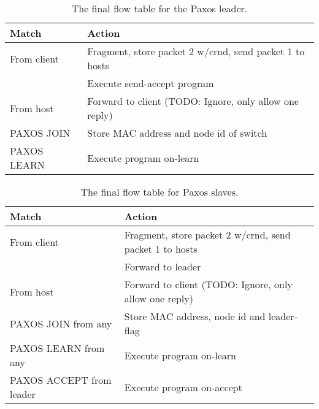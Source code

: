 \begin{table}[H]
  \centering
  \begin{tabular}{|l|l|}
    \hline \textbf{Match} & \textbf{Action} \\
    \hline From client & Fragment, store packet 2 w/crnd, send packet 1 to hosts \\
                       & Execute send-accept program \\
    \hline From host & Forward to client (TODO: Ignore, only allow one reply) \\
    \hline PAXOS JOIN  & Store MAC address and node id of switch \\
    \hline PAXOS LEARN & Execute program on-learn \\
    \hline
  \end{tabular}
  \caption{The final flow table for the Paxos leader.}
  \label{table:complete.match.leader}
\end{table}

\begin{table}[H]
  \centering
  \begin{tabular}{|l|l|}
    \hline \textbf{Match} & \textbf{Action} \\
    \hline From client & Fragment, store packet 2 w/crnd, send packet 1 to hosts \\
                       & Forward to leader \\
    \hline From host & Forward to client (TODO: Ignore, only allow one reply) \\
    \hline PAXOS JOIN from any & Store MAC address, node id and leader-flag \\
    \hline PAXOS LEARN from any & Execute program on-learn \\
    \hline PAXOS ACCEPT from leader & Execute program on-accept \\
    \hline
  \end{tabular}
  \caption{The final flow table for Paxos slaves.}
  \label{table:complete.match.slave}
\end{table}
